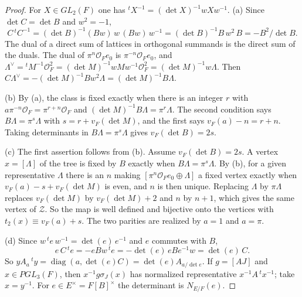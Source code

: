 \documentclass[12pt,letterpaper]{amsart}
\numberwithin{equation}{section}
\theoremstyle{definition}
\theoremstyle{plain}
\begin{document}
\begin{proof}
For $X\in GL_2(F)$ one has ${}^tX^{-1}=(\det X)^{-1}wXw^{-1}$.
(a) Since $\det C=\det B$ and $w^2=-1$,
\[
 C\,{}^tC^{-1}=(\det B)^{-1}(Bw)\,w\,(Bw)\,w^{-1}
 =(\det B)^{-1}B\,w^2\,B=-B^2/\det B .
\]
The dual of a direct sum of lattices in orthogonal summands is the
direct sum of the duals. The dual of $\pi^n\mathcal O_Fe_0$ is
$\pi^{-n}\mathcal O_Fe_0$, and
$\Lambda^\vee={}^tM^{-1}\mathcal O_F^2
=(\det M)^{-1}wMw^{-1}\mathcal O_F^2=(\det M)^{-1}w\Lambda$.
Then $C\Lambda^\vee=-(\det M)^{-1}Bw^2\Lambda=(\det M)^{-1}B\Lambda$.

(b) By (a), the class is fixed exactly when there is an integer $r$
with $a\pi^{-n}\mathcal O_F=\pi^{r+n}\mathcal O_F$ and
$(\det M)^{-1}B\Lambda=\pi^r\Lambda$. The second condition says
$B\Lambda=\pi^s\Lambda$ with $s=r+v_F(\det M)$, and the first says
$v_F(a)-n=r+n$. Taking determinants in $B\Lambda=\pi^s\Lambda$ gives
$v_F(\det B)=2s$.

(c) The first assertion follows from (b). Assume $v_F(\det B)=2s$. A
vertex $x=[\Lambda]$ of the tree is fixed by $B$ exactly when
$B\Lambda=\pi^s\Lambda$. By (b), for a given representative $\Lambda$
there is an $n$ making $[\pi^n\mathcal O_Fe_0\oplus\Lambda]$ a fixed
vertex exactly when $v_F(a)-s+v_F(\det M)$ is even, and $n$ is then
unique. Replacing $\Lambda$ by $\pi\Lambda$ replaces $v_F(\det M)$ by
$v_F(\det M)+2$ and $n$ by $n+1$, which gives the same vertex of
$\mathcal Z$. So the map is well defined and bijective onto the
vertices with $t_2(x)\equiv v_F(a)+s$. The two parities are realized
by $a=1$ and $a=\pi$.

(d) Since $w\,{}^te\,w^{-1}=\det(e)\,e^{-1}$ and $e$ commutes with
$B$,
\[
 e\,C\,{}^te=-eBw\,{}^te=-\det(e)\,eBe^{-1}w=\det(e)\,C .
\]
So $yA_a\,{}^ty=\operatorname{diag}(a,\det(e)C)=\det(e)A_{a/\det e}$.
If $g=[A J]$ and $x\in PGL_3(F)$, then $x^{-1}g\sigma_J(x)$ has
normalized representative $x^{-1}A\,{}^tx^{-1}$; take $x=y^{-1}$.
For $e\in E^\times=F[B]^\times$ the determinant is $N_{E/F}(e)$.
\end{proof}
\end{document}
